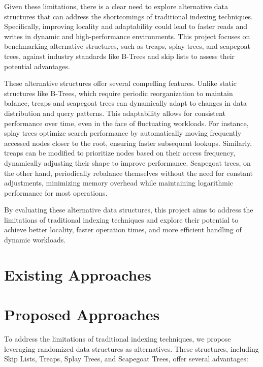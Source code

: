 \documentclass[sigconf]{acmart}
\begin{document}
Given these limitations, there is a clear need to explore alternative data structures that can address the shortcomings of traditional indexing techniques. Specifically, improving locality and adaptability could lead to faster reads and writes in dynamic and high-performance environments. This project focuses on benchmarking alternative structures, such as treaps, splay trees, and scapegoat trees, against industry standards like B-Trees and skip lists to assess their potential advantages.

These alternative structures offer several compelling features. Unlike static structures like B-Trees, which require periodic reorganization to maintain balance, treaps and scapegoat trees can dynamically adapt to changes in data distribution and query patterns. This adaptability allows for consistent performance over time, even in the face of fluctuating workloads. For instance, splay trees optimize search performance by automatically moving frequently accessed nodes closer to the root, ensuring faster subsequent lookups. Similarly, treaps can be modified to prioritize nodes based on their access frequency, dynamically adjusting their shape to improve performance. Scapegoat trees, on the other hand, periodically rebalance themselves without the need for constant adjustments, minimizing memory overhead while maintaining logarithmic performance for most operations.

By evaluating these alternative data structures, this project aims to address the limitations of traditional indexing techniques and explore their potential to achieve better locality, faster operation times, and more efficient handling of dynamic workloads.


\section{Existing Approaches}


\section{Proposed Approaches}

To address the limitations of traditional indexing techniques, we propose leveraging randomized data structures as alternatives. These structures, including Skip Lists, Treaps, Splay Trees, and Scapegoat Trees, offer several advantages:
\end{document}
